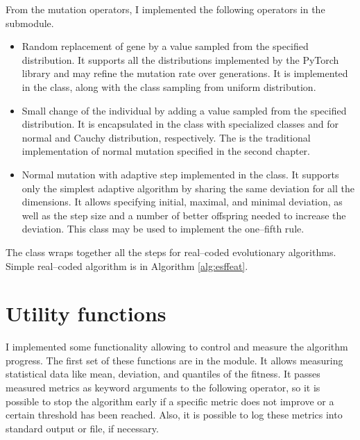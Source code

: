 From the mutation operators, I implemented the following operators in the  submodule.
\begin{itemize}
    \item Random replacement of gene by a value sampled from the specified distribution. It supports all the distributions implemented by the PyTorch library \citep{PyTorchDoc} and may refine the mutation rate over generations. It is implemented in the  class, along with the  class sampling from uniform distribution.
    \item Small change of the individual by adding a value sampled from the specified distribution. It is encapsulated in the  class with specialized classes  and  for normal and Cauchy distribution, respectively. The  is the traditional implementation of normal mutation specified in the second chapter.
    \item Normal mutation with adaptive step implemented in the  class. It supports only the simplest adaptive algorithm by sharing the same deviation for all the dimensions. It allows specifying initial, maximal, and minimal deviation, as well as the step size and a number of better offspring needed to increase the deviation. This class may be used to implement the one--fifth rule.
\end{itemize}

The  class wraps together all the steps for real--coded evolutionary algorithms. Simple real--coded algorithm is in Algorithm \ref{alg:esffeat}.
    



\section{Utility functions}

I implemented some functionality allowing to control and measure the algorithm progress. The first set of these functions are in the  module. It allows measuring statistical data like mean, deviation, and quantiles of the fitness. It passes measured metrics as keyword arguments to the following operator, so it is possible to stop the algorithm early if a specific metric does not improve or a certain threshold has been reached. Also, it is possible to log these metrics into standard output or file, if necessary.

